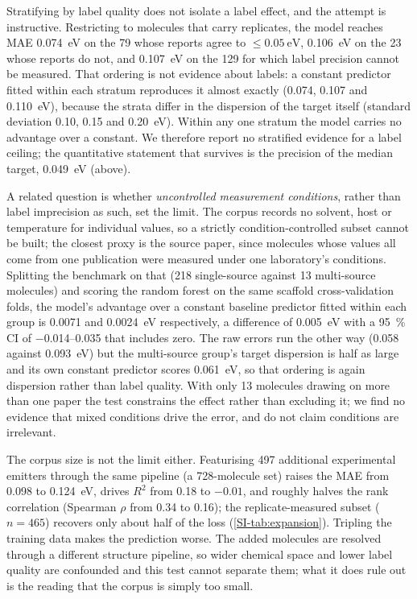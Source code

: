 Stratifying by label quality does not isolate a label effect, and the attempt is
instructive. Restricting to molecules that carry replicates, the model reaches MAE
\qty{0.074}{\electronvolt} on the \num{79} whose reports agree to
$\le\qty{0.05}{\electronvolt}$, \qty{0.106}{\electronvolt} on the \num{23} whose
reports do not, and \qty{0.107}{\electronvolt} on the \num{129} for which label
precision cannot be measured. That ordering is not evidence about labels: a constant
predictor fitted within each stratum reproduces it almost exactly
(\qty{0.074}{}, \qty{0.107}{} and \qty{0.110}{\electronvolt}), because the strata
differ in the dispersion of the target itself (standard deviation \qty{0.10}{},
\qty{0.15}{} and \qty{0.20}{\electronvolt}). Within any one stratum the model carries
no advantage over a constant. We therefore report no stratified evidence for a label
ceiling; the quantitative statement that survives is the precision of the median target,
\qty{0.049}{\electronvolt} (above).

A related question is whether \emph{uncontrolled measurement conditions}, rather than
label imprecision as such, set the limit. The corpus records no solvent, host or
temperature for individual values, so a strictly condition-controlled subset cannot be
built; the closest proxy is the source paper, since molecules whose values all come from
one publication were measured under one laboratory's conditions. Splitting the benchmark on that
(\num{218} single-source against \num{13} multi-source molecules) and scoring the random
forest on the same scaffold cross-validation folds, the model's advantage
over a constant baseline predictor fitted within each group is \qty{0.0071}{} and
\qty{0.0024}{\electronvolt} respectively, a difference of \qty{0.005}{\electronvolt}
with a \qty{95}{\percent} CI of \numrange{-0.014}{0.035} that includes zero. The raw
errors run the other way (\qty{0.058}{} against \qty{0.093}{\electronvolt}) but the
multi-source group's target dispersion is half as large and its own constant predictor
scores \qty{0.061}{\electronvolt}, so that ordering is again dispersion rather than
label quality. With only \num{13} molecules drawing on more than one paper the test
constrains the effect rather than excluding it; we find no evidence that mixed conditions
drive the error, and do not claim conditions are irrelevant.

The corpus size is not the limit either. Featurising \num{497} additional
experimental emitters through the same pipeline (a \num{728}-molecule set) raises
the MAE from \qty{0.098}{} to \qty{0.124}{\electronvolt}, drives $R^2$ from
\num{0.18} to $-0.01$, and roughly halves the rank correlation (Spearman $\rho$
from \num{0.34} to \num{0.16}); the replicate-measured subset
($n = \num{465}$) recovers only about half of the loss (\cref{SI-tab:expansion}).
Tripling the training data makes the prediction worse. The added molecules are resolved
through a different structure pipeline, so wider chemical space and lower label quality are
confounded and this test cannot separate them; what it does rule out is the reading that
the corpus is simply too small.


